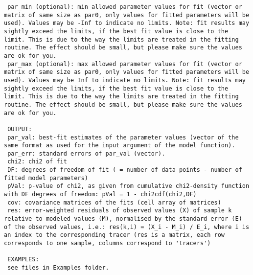 \begin{lstlisting}
 par_min (optional): min allowed parameter values for fit (vector or matrix of same size as par0, only values for fitted parameters will be used). Values may be -Inf to indicate no limits. Note: fit results may sightly exceed the limits, if the best fit value is close to the limit. This is due to the way the limits are treated in the fitting routine. The effect should be small, but please make sure the values are ok for you.
 par_max (optional): max allowed parameter values for fit (vector or matrix of same size as par0, only values for fitted parameters will be used). Values may be Inf to indicate no limits. Note: fit results may sightly exceed the limits, if the best fit value is close to the limit. This is due to the way the limits are treated in the fitting routine. The effect should be small, but please make sure the values are ok for you.

 OUTPUT:
 par_val: best-fit estimates of the parameter values (vector of the same format as used for the input argument of the model function).
 par_err: standard errors of par_val (vector).
 chi2: chi2 of fit
 DF: degrees of freedom of fit ( = number of data points - number of fitted model parameters)
 pVal: p-value of chi2, as given from cumulative chi2-density function with DF degrees of freedom: pVal = 1 - chi2cdf(chi2,DF)
 cov: covariance matrices of the fits (cell array of matrices)
 res: error-weighted residuals of observed values (X) of sample k relative to modeled values (M), normalised by the standard error (E) of the observed values, i.e.: res(k,i) = (X_i - M_i) / E_i, where i is an index to the corresponding tracer (res is a matrix, each row corresponds to one sample, columns correspond to 'tracers')

 EXAMPLES:
 see files in Examples folder.

 
\end{lstlisting}


